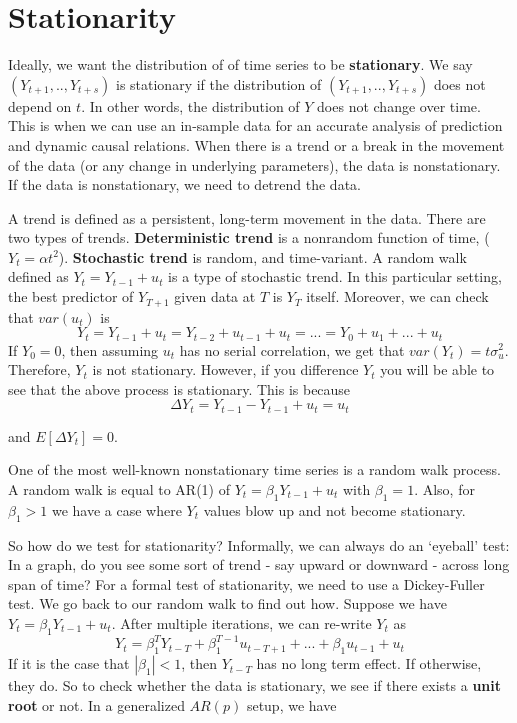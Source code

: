 \section{Stationarity}
Ideally, we want the distribution of of time series to be \textbf{stationary}. We say $(Y_{t+1},..,Y_{t+s})$ is stationary if the distribution of $(Y_{t+1},..,Y_{t+s})$ does not depend on $t$. In other words, the distribution of $Y$ does not change over time. This is when we can use an in-sample data for an accurate analysis of prediction and dynamic causal relations. When there is a trend or a break in the movement of the data (or any change in underlying parameters), the data is nonstationary. If the data is nonstationary, we need to detrend the data. 
\par\medskip
A trend is defined as a persistent, long-term movement in the data. There are two types of trends. \textbf{Deterministic trend} is a nonrandom  function of time, ($Y_t = \alpha t^2$). \textbf{Stochastic trend} is random, and time-variant. A random walk defined as $Y_t = Y_{t-1}+u_t$ is a type of stochastic trend. In this particular setting, the best predictor of $Y_{T+1}$ given data at $T$ is $Y_T$ itself. Moreover, we can check that $var(u_t)$ is
\[
Y_t = Y_{t-1}+u_t = Y_{t-2}+u_{t-1}+u_t = ... = Y_0 + u_1 + ... +u_t
\]
If $Y_0=0$,  then assuming $u_t$ has no serial correlation, we get that $var(Y_t)=t\sigma_u^2$. Therefore, $Y_t$ is not stationary. However, if you difference $Y_t$ you will be able to see that the above process is stationary. This is because
\[
\Delta Y_t = Y_{t-1}-Y_{t-1}+u_t = u_t
\]\par\medskip
and $E[\Delta Y_t ]=0$.
\par\medskip
One of the most well-known nonstationary time series is a random walk process. A random walk is equal to AR(1) of $Y_t = \beta_1Y_{t-1}+u_t$ with $\beta_1=1$. Also, for $\beta_1>1$ we have a case where $Y_t$ values blow up and not become stationary. 
\par\medskip
So how do we test for stationarity? Informally, we can always do an `eyeball' test: In a graph, do you see some sort of trend - say upward or downward - across long span of time? For a formal test of stationarity, we need to use a Dickey-Fuller test. We go back to our random walk to find out how. Suppose we have $Y_t = \beta_1 Y_{t-1}+u_t$. After multiple iterations, we can re-write $Y_t$ as
\[
Y_t = \beta_1^T Y_{t-T}+\beta_1^{T-1}u_{t-T+1}+...+\beta_1 u_{t-1}+u_t
\]
If it is the case that $|\beta_1|<1$, then $Y_{t-T}$ has no long term effect. If otherwise, they do. So to check whether the data is stationary, we see if there exists a \textbf{unit root} or not. In a generalized $AR(p)$ setup, we have 

